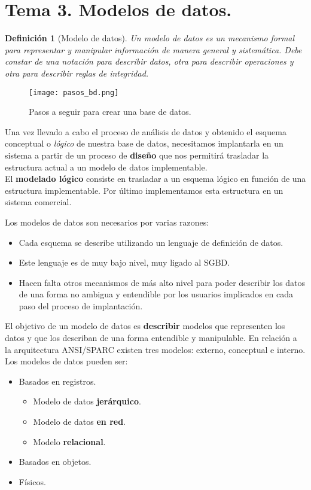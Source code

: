 \documentclass[12pt,spanish]{article}
\newtheorem{definition}{Definición}
\numberwithin{definition}{subsection}
\begin{document}
\newpage

\section{Tema 3. Modelos de datos.}

\begin{definition}[Modelo de datos]
Un modelo de datos es un mecanismo formal para representar y manipular información de manera general y sistemática. Debe constar de una notación para describir datos, otra para describir operaciones y otra para describir reglas de integridad.
\end{definition}

\begin{figure}[H]
\centering
\texttt{[image: pasos\_bd.png]}
\caption{Pasos a seguir para crear una base de datos.}
\end{figure}

Una vez llevado a cabo el proceso de análisis de datos y obtenido el esquema conceptual o \emph{lógico} de nuestra base de datos, necesitamos implantarla en un sistema a partir de un proceso de \textbf{diseño} que nos permitirá trasladar la estructura actual a un modelo de datos implementable.\\

El \textbf{modelado lógico} consiste en trasladar a un esquema lógico en función de una estructura implementable. Por último implementamos esta estructura en un sistema comercial.

Los modelos de datos son necesarios por varias razones:
\begin{itemize}
	\item Cada esquema se describe utilizando un lenguaje de definición de datos.
	\item Este lenguaje es de muy bajo nivel, muy ligado al SGBD.
	\item Hacen falta otros mecanismos de más alto nivel para poder describir los datos  de una forma no ambigua y entendible por los usuarios implicados en cada paso del proceso de implantación.
\end{itemize}


El objetivo de un modelo de datos es \textbf{describir} modelos que representen los datos y que los describan de una forma entendible y manipulable. En relación a la arquitectura ANSI/SPARC existen tres modelos: externo, conceptual e interno.\\

Los modelos de datos  pueden ser:
\begin{itemize}
	\item Basados en registros.
		\begin{itemize}
			\item  Modelo de datos \textbf{jerárquico}.
			\item  Modelo de datos \textbf{en red}.
			\item  Modelo \textbf{relacional}.
		\end{itemize}
	\item Basados en objetos.
	\item Físicos.
\end{itemize}
\end{document}

